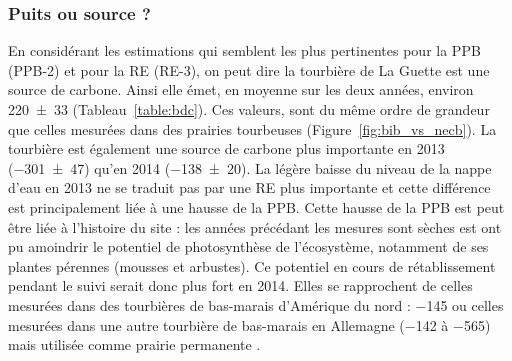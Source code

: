 \subsubsection{Puits ou source ?}

En considérant les estimations qui semblent les plus pertinentes pour la PPB (PPB-2) et pour la RE (RE-3), on peut dire la tourbière de La Guette est une source de carbone.
Ainsi elle émet, en moyenne sur les deux années, environ \SI{220(33)}{\gcma} (Tableau~\ref{table:bdc}).
Ces valeurs, sont du même ordre de grandeur que celles mesurées dans des prairies tourbeuses (Figure~\ref{fig:bib_vs_necb}).
La tourbière est également une source de carbone plus importante en 2013 (\SI{-301(47)}{\gcma}) qu'en 2014 (\SI{-138(20)}{\gcma}).
La légère baisse du niveau de la nappe d'eau en 2013 ne se traduit pas par une RE plus importante et cette différence est principalement liée à une hausse de la PPB.
Cette hausse de la PPB est peut être liée à l'histoire du site : les années précédant les mesures sont sèches est ont pu amoindrir le potentiel de photosynthèse de l'écosystème, notamment de ses plantes pérennes (mousses et arbustes).
Ce potentiel en cours de rétablissement pendant le suivi serait donc plus fort en 2014.
Elles se rapprochent de celles mesurées dans des tourbières de bas-marais d'Amérique du nord : \SI{-145}{\gcma} \citep{carroll1997} ou celles mesurées dans une autre tourbière de bas-marais en Allemagne (\num{-142} à \SI{-565}{\gcma}) mais utilisée comme prairie permanente \citep{beyer2015}.


